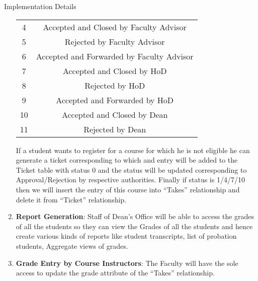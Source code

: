 \documentclass{beamer}
\begin{document}
\begin{frame}[allowframebreaks]{Implementation Details}
\begin{enumerate}
\begin{center}
\begin{tabular}{c |c}
4&Accepted and Closed by Faculty Advisor\\
5&Rejected by Faculty Advisor\\
6& Accepted and Forwarded by Faculty Advisor\\
7&Accepted and Closed by HoD\\
8&Rejected by HoD\\
9&Accepted and Forwarded by HoD\\
10&Accepted and Closed by Dean\\
11&Rejected by Dean
\end{tabular}
\end{center}
If a student wants to register for a course for which he is not eligible he can generate a ticket corresponding to which and entry will be added to the Ticket table with status 0 and the status will be updated corresponding to Approval/Rejection by respective authorities. Finally if status is 1/4/7/10 then we will insert the entry of this course into ``Takes'' relationship and delete it from ``Ticket'' relationship.

\item {\bf Report Generation}: Staff of Dean's Office will be able to access the grades of all the students so they can view the Grades of all the students and hence create various kinds of reports like student transcripts, list of probation students, Aggregate views of grades.

\item {\bf Grade Entry by Course Instructors}: The Faculty will have the sole access to update the grade attribute of the ``Takes'' relationship.
\end{enumerate}
\end{frame}
\end{document}
